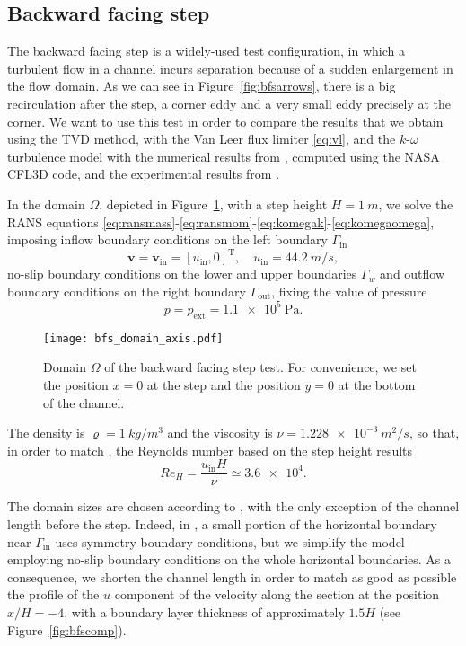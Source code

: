 \subsection{Backward facing step}
The backward facing step is a widely-used test configuration, in which a turbulent flow in a channel incurs separation because of a sudden enlargement in the flow domain. As we can see in Figure~\ref{fig:bfsarrows}, there is a big recirculation after the step, a corner eddy and a very small eddy precisely at the corner. We want to use this test in order to compare the results that we obtain using the TVD method, with the Van Leer flux limiter \eqref{eq:vl}, and the $k\text{-}\omega$ turbulence model with the numerical results from \cite{web:nasa}, computed using the NASA CFL3D code, and the experimental results from \cite{bfs:driver}.

In the domain $\Omega$, depicted in Figure~\ref{fig:bfsdomain}, with a step height $H=\SI{1}{m}$, we solve the RANS equations \eqref{eq:ransmass}-\eqref{eq:ransmom}-\eqref{eq:komegak}-\eqref{eq:komegaomega}, imposing inflow boundary conditions on the left boundary $\Gamma_\text{in}$
\begin{equation}
	\mathbf{v} = \mathbf{v}_\text{in} = [u_\text{in}, 0]^\mathrm{T}, \quad u_\text{in} = \SI{44.2}{m/s},
\end{equation} no-slip boundary conditions on the lower and upper boundaries $\Gamma_w$ and outflow boundary conditions on the right boundary $\Gamma_\text{out}$, fixing the value of pressure
\begin{equation}
	p = p_\text{ext} = \SI{1.1e5}{\pascal}.
\end{equation}
\begin{figure}
	\centering
	\texttt{[image: bfs\_domain\_axis.pdf]}
	\caption[Domain of the backward facing step test]{Domain $\Omega$ of the backward facing step test. For convenience, we set the position $x=0$ at the step and the position $y=0$ at the bottom of the channel.}
	\label{fig:bfsdomain}
\end{figure}
The density is $\varrho = \SI{1}{kg/m^3}$ and the viscosity is $\nu=\SI{1.228e-3}{m^2/s}$, so that, in order to match \cite{web:nasa}, the Reynolds number based on the step height results
\begin{equation}
	Re_H = \frac{u_\text{in}H}{\nu} \simeq \num{3.6e4}.
\end{equation}

The domain sizes are chosen according to \cite{web:nasa}, with the only exception of the channel length before the step. Indeed, in \cite{web:nasa}, a small portion of the horizontal boundary near $\Gamma_\text{in}$ uses symmetry boundary conditions, but we simplify the model employing no-slip boundary conditions on the whole horizontal boundaries. As a consequence, we shorten the channel length in order to match as good as possible the profile of the $u$ component of the velocity along the section at the position $x/H=-4$, with a boundary layer thickness of approximately $1.5H$ (see Figure~\ref{fig:bfscomp}).

